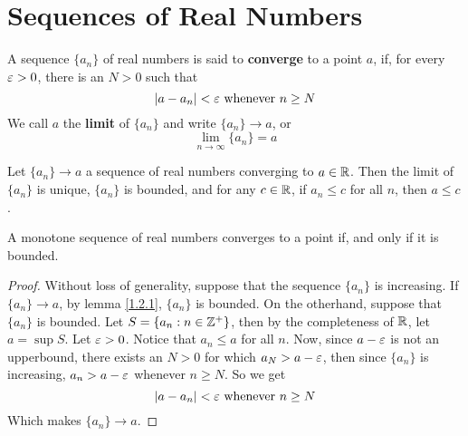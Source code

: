 \section{Sequences of Real Numbers}

\begin{definition}
    A sequence $\{a_n\}$ of real numbers is said to \textbf{converge} to a point
    $a$, if, for every  $\varepsilon>0$, there is an  $N>0$ such that
    \begin{equation*}
        |a-a_n|<\varepsilon \text{ whenever } n \geq N
    \end{equation*}
    We call $a$ the  \textbf{limit} of $\{a_n\}$ and write $\{a_n\} \xrightarrow{}
    a$, or
    \begin{equation*}
        \lim_{n \xrightarrow{} \infty}{\{a_n\}}=a
    \end{equation*}
\end{definition}

\begin{lemma}\label{1.2.1}
    Let $\{a_n\} \xrightarrow{} a$ a sequence of real numbers converging to $a
    \in \mathbb{R}$. Then the limit of  $\{a_n\}$ is unique, $\{a_n\}$ is bounded, and
    for any $c \in \mathbb{R}$, if  $a_n \leq c$ for all  $n$, then  $a \leq c$.
\end{lemma}

\begin{theorem}\label{1.2.2}
    A monotone sequence of real numbers converges to a point if, and only if it
    is bounded.
\end{theorem}
\begin{proof}
    Without loss of generality, suppose that the sequence $\{a_n\}$ is
    increasing. If $\{a_n\} \xrightarrow{} a$, by lemma \ref{1.2.1}, $\{a_n\}$
    is bounded. On the otherhand, suppose that $\{a_n\}$ is bounded. Let
    $S=\{a_n : n \in \mathbb{Z}^+\}$, then by the completeness of $\mathbb{R}$, let
    $a=\sup{S}$. Let $\varepsilon>0$. Notice that  $a_n \leq a$ for all  $n$. Now, since
     $a-\varepsilon$ is not an upperbound, there exists an  $N>0$ for which  $a_N>a-\varepsilon$,
     then since  $\{a_n\}$ is increasing, $a_n>a-\varepsilon$ whenever  $n \geq N$. So we get
     \begin{equation*}
         |a-a_n|<\varepsilon \text{ whenever } n \geq N
     \end{equation*}
     Which makes $\{a_n\} \xrightarrow{} a$.
\end{proof}

